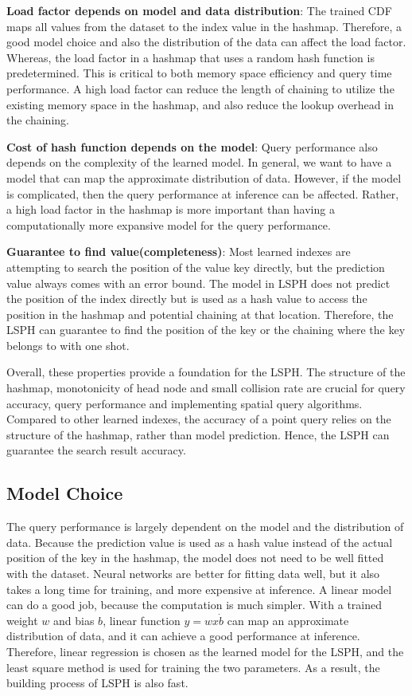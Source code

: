 \textbf{Load factor depends on model and data distribution}: The trained CDF maps all values from the dataset to the index value in the hashmap. Therefore, a good model choice and also the distribution of the data can affect the load factor. Whereas, the load factor in a hashmap that uses a random hash function is predetermined. This is critical to both memory space efficiency and query time performance. A high load factor can reduce the length of chaining to utilize the existing memory space in the hashmap, and also reduce the lookup overhead in the chaining. 

\textbf{Cost of hash function depends on the model}: Query performance also depends on the complexity of the learned model. In general, we want to have a model that can map the approximate distribution of data. However, if the model is complicated, then the query performance at inference can be affected. Rather, a high load factor in the hashmap is more important than having a computationally more expansive model for the query performance. 

\textbf{Guarantee to find value(completeness)}: Most learned indexes are attempting to search the position of the value key directly, but the prediction value always comes with an error bound. The model in LSPH does not predict the position of the index directly but is used as a hash value to access the position in the hashmap and potential chaining at that location. Therefore, the LSPH can guarantee to find the position of the key or the chaining where the key belongs to with one shot. 


Overall, these properties provide a foundation for the LSPH. The structure of the hashmap, monotonicity of head node and small collision rate are crucial for query accuracy, query performance and implementing spatial query algorithms. Compared to other learned indexes, the accuracy of a point query relies on the structure of the hashmap, rather than model prediction. Hence, the LSPH can guarantee the search result accuracy. 

\subsection{Model Choice}
The query performance is largely dependent on the model and the distribution of data. Because the prediction value is used as a hash value instead of the actual position of the key in the hashmap, the model does not need to be well fitted with the dataset. Neural networks are better for fitting data well, but it also takes a long time for training, and more expensive at inference. A linear model can do a good job, because the computation is much simpler. With a trained weight $w$ and bias $b$, linear function $y = wx \dot b$ can map an approximate distribution of data, and it can achieve a good performance at inference. Therefore, linear regression is chosen as the learned model for the LSPH, and the least square method is used for training the two parameters. As a result, the building process of LSPH is also fast. 


